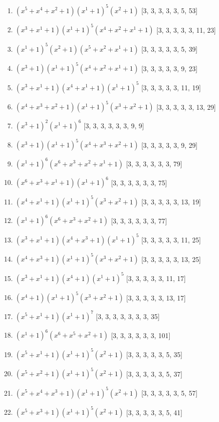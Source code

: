 \documentclass[10pt,twocolumn]{article}
\begin{document}
\begin{enumerate}
\item $(x^{5} + x^{4} + x^{2} + 1)(x^{1} + 1)^{5}(x^{2} + 1)$  [3, 3, 3, 3, 3, 5, 53]
\item $(x^{3} + x^{1} + 1)(x^{1} + 1)^{5}(x^{4} + x^{2} + x^{1} + 1)$  [3, 3, 3, 3, 3, 11, 23]
\item $(x^{1} + 1)^{5}(x^{2} + 1)(x^{5} + x^{2} + x^{1} + 1)$  [3, 3, 3, 3, 3, 5, 39]
\item $(x^{3} + 1)(x^{1} + 1)^{5}(x^{4} + x^{2} + x^{1} + 1)$  [3, 3, 3, 3, 3, 9, 23]
\item $(x^{3} + x^{1} + 1)(x^{4} + x^{1} + 1)(x^{1} + 1)^{5}$  [3, 3, 3, 3, 3, 11, 19]
\item $(x^{4} + x^{3} + x^{2} + 1)(x^{1} + 1)^{5}(x^{3} + x^{2} + 1)$  [3, 3, 3, 3, 3, 13, 29]
\item $(x^{3} + 1)^{2}(x^{1} + 1)^{6}$  [3, 3, 3, 3, 3, 3, 9, 9]
\item $(x^{3} + 1)(x^{1} + 1)^{5}(x^{4} + x^{3} + x^{2} + 1)$  [3, 3, 3, 3, 3, 9, 29]
\item $(x^{1} + 1)^{6}(x^{6} + x^{3} + x^{2} + x^{1} + 1)$  [3, 3, 3, 3, 3, 3, 79]
\item $(x^{6} + x^{3} + x^{1} + 1)(x^{1} + 1)^{6}$  [3, 3, 3, 3, 3, 3, 75]
\item $(x^{4} + x^{1} + 1)(x^{1} + 1)^{5}(x^{3} + x^{2} + 1)$  [3, 3, 3, 3, 3, 13, 19]
\item $(x^{1} + 1)^{6}(x^{6} + x^{3} + x^{2} + 1)$  [3, 3, 3, 3, 3, 3, 77]
\item $(x^{3} + x^{1} + 1)(x^{4} + x^{3} + 1)(x^{1} + 1)^{5}$  [3, 3, 3, 3, 3, 11, 25]
\item $(x^{4} + x^{3} + 1)(x^{1} + 1)^{5}(x^{3} + x^{2} + 1)$  [3, 3, 3, 3, 3, 13, 25]
\item $(x^{3} + x^{1} + 1)(x^{4} + 1)(x^{1} + 1)^{5}$  [3, 3, 3, 3, 3, 11, 17]
\item $(x^{4} + 1)(x^{1} + 1)^{5}(x^{3} + x^{2} + 1)$  [3, 3, 3, 3, 3, 13, 17]
\item $(x^{5} + x^{1} + 1)(x^{1} + 1)^{7}$  [3, 3, 3, 3, 3, 3, 3, 35]
\item $(x^{1} + 1)^{6}(x^{6} + x^{5} + x^{2} + 1)$  [3, 3, 3, 3, 3, 3, 101]
\item $(x^{5} + x^{1} + 1)(x^{1} + 1)^{5}(x^{2} + 1)$  [3, 3, 3, 3, 3, 5, 35]
\item $(x^{5} + x^{2} + 1)(x^{1} + 1)^{5}(x^{2} + 1)$  [3, 3, 3, 3, 3, 5, 37]
\item $(x^{5} + x^{4} + x^{3} + 1)(x^{1} + 1)^{5}(x^{2} + 1)$  [3, 3, 3, 3, 3, 5, 57]
\item $(x^{5} + x^{3} + 1)(x^{1} + 1)^{5}(x^{2} + 1)$  [3, 3, 3, 3, 3, 5, 41]

\end{enumerate}
\end{document}
